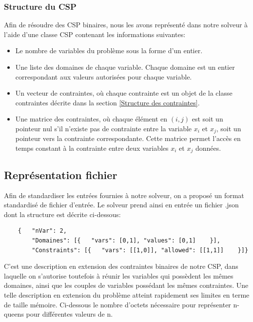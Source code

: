\documentclass[14pt]{article}
\begin{document}
\subsubsection{Structure du CSP}

Afin de résoudre des CSP binaires, nous les avons représenté dans notre solveur à l'aide d'une classe CSP contenant les informations suivantes:

\begin{itemize}
    \item Le nombre de variables du problème sous la forme d'un entier.
    \item Une liste des domaines de chaque variable. Chaque domaine est un entier correspondant aux valeurs autorisées pour chaque variable.
    \item Un vecteur de contraintes, où chaque contrainte est un objet de la classe contraintes décrite dans la section \ref{Structure des contraintes}.
    \item Une matrice des contraintes, où chaque élément en $(i,j)$ est soit un pointeur nul s'il n'existe pas de contrainte entre la variable $x_i$ et $x_j$, soit un pointeur vers la contrainte correspondante. Cette matrice permet l'accès en temps constant à la contrainte entre deux variables $x_i$ et $x_j$ données.
\end{itemize}

\subsection{Représentation fichier}

Afin de standardiser les entrées fournies à notre solveur, on a proposé un format standardisé de fichier d'entrée. Le solveur prend ainsi en entrée un fichier .json dont la structure est décrite ci-dessous:

\begin{verbatim}
	{   "nVar": 2,
	    "Domaines": [{   "vars": [0,1], "values": [0,1]    }],
	    "Constraints": [{   "vars": [[1,0]], "allowed": [[1,1]]    }]}
\end{verbatim}

C'est une description en extension des contraintes binaires de notre CSP, dans laquelle on s'autorise toutefois à réunir les variables qui possèdent les mêmes domaines, ainsi que les couples de variables possédant les mêmes contraintes. Une telle description en extension du problème atteint rapidement ses limites en terme de taille mémoire. Ci-dessous le nombre d'octets nécessaire pour représenter n-queens pour différentes valeurs de n.
\end{document}
